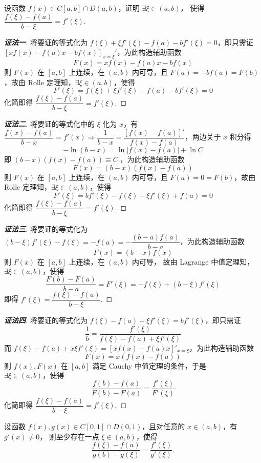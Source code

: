 \begin{example}
    设函数 $f(x)\in C[a,b]\cap D(a,b)$，证明 $\exists\xi\in(a,b)$，
    使得 $\dfrac{f(\xi)-f(a)}{b-\xi}=f'(\xi).$
\end{example}
\begin{proof}[{\songti \textbf{证法一}}]
    将要证的等式化为 $f(\xi)  +\xi f'(\xi)  -f(a)  -bf'(\xi)  =0$，即只需证
    $\left[ xf(x)  -f(a)  x-bf(x)  \right] _{x=\xi }'$，为此构造辅助函数
    $$F(x)  =xf(x)  -f(a)  x-bf(x)  $$
    则 $F(x)$ 在 $[a,b]$ 上连续，在 $(a,b)$ 内可导，且 $F(a)=-bf(a)=F(b)$，故由 Rolle 定理知，$\exists\xi\in(a,b)\text{，使得 }$
    $$F'(\xi)=f(\xi)+\xi f'(\xi)-f(a)-bf'(\xi)=0$$
    化简即得 $\dfrac{f(\xi)-f(a)}{b-\xi}=f'(\xi).$
\end{proof}
\begin{proof}[{\songti \textbf{证法二}}]
    将要证的等式化中的 $\xi$ 化为 $x$，有 $\dfrac{f(x)-f(a)}{b-x}=f'(x)  \Rightarrow\dfrac{1}{b-x}=\dfrac{[f(x)-f(a)]'}{f(x)-f(a)}$，两边关于 $x$ 积分得 $$-\ln(b-x)=\ln|f(x)-f(a)|+\ln C$$
    即 $(b-x)(f(x)-f(a))\equiv C.$，为此构造辅助函数
    $$F(x)=(b-x)(f(x)-f(a))$$
    则 $F(x)$ 在 $[a,b]$ 上连续，在 $(a,b)$ 内可导，且 $F(a)=0=F(b)$，故由 Rolle 定理知，$\exists\xi\in(a,b)\text{，使得 }$
    $$F'(\xi)=bf'(\xi)-f(\xi)-\xi f'(\xi)+f(a)=0$$
    化简即得 $\dfrac{f(\xi)-f(a)}{b-\xi}=f'(\xi).$
\end{proof}
\begin{proof}[{\songti \textbf{证法三}}]
    将要证的等式化为 $(b-\xi)f'(\xi)-f(\xi)=-f(a)=-\dfrac{(b-a)f(a)}{b-a}$，为此构造辅助函数
    $$F(x)=(b-x)f(x)$$ 则 $F(x)$ 在 $[a,b]$ 上连续，在 $(a,b)$ 内可导，
    故由 Lagrange 中值定理知，$\exists\xi\in(a,b)\text{，使得 }$
    $$\dfrac{F(b)-F(a)}{b-a}=F'(\xi)=-f(\xi)+(b-\xi)f'(\xi)$$
    即得 $f'(\xi)=\dfrac{f(\xi)-f(a)}{b-\xi}.$
\end{proof}
\begin{proof}[{\songti \textbf{证法四}}]
    将要证的等式化为 $f(\xi)-f(a)+\xi f'(\xi)=bf'(\xi)$，即只需证 $$\dfrac{1}{b}=\dfrac{f'(\xi)}{f(\xi)-f(a)+\xi f'(\xi)}$$
    而 $f(\xi)-f(a)+x\xi f'(\xi)=\left[xf(x)-f(a)x\right]'_{x=\xi}$，为此构造辅助函数
    $$F(x)=x(f(x)-f(a))$$
    则 $f(x),F(x)$ 在 $[a,b]$ 满足 Cauchy 中值定理的条件，于是 $\exists\xi\in(a,b)\text{，使得 }$
    $$\dfrac{f(b)-f(a)}{F(b)-F(a)}=\dfrac{f'(\xi)}{F'(\xi)}$$
    化简即得 $\dfrac{f(\xi)-f(a)}{b-\xi}=f'(\xi).$
\end{proof}
\begin{inference}
    设函数 $f(x),g(x)\in C[0,1]\cap D(0,1)$，且对任意的 $x\in(a,b)$，有 $g'(x)\neq0$，
    则至少存在一点 $\xi\in(a,b)$，使得 $$\dfrac{f(\xi)-f(a)}{g(b)-g(\xi)}=\dfrac{f'(\xi)}{g'(\xi)}.$$
\end{inference}
